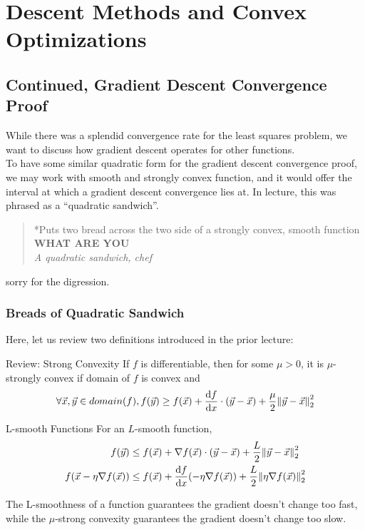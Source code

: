 \chapter{Descent Methods and Convex Optimizations}

\section{Continued, Gradient Descent Convergence Proof}
While there was a splendid convergence rate for the least squares problem, we want to discuss how gradient descent operates for other functions. \\
To have some similar quadratic form for the gradient descent convergence proof, we may work with smooth and strongly convex function, and it would offer the interval at which a gradient descent convergence lies at.
In lecture, this was phrased as a ``quadratic sandwich''.
\begin{quote}
    *Puts two bread across the two side of a strongly convex, smooth function \\
    \textbf{WHAT ARE YOU} \\
    \textit{A quadratic sandwich, chef}
\end{quote}
sorry for the digression.

\subsection{Breads of Quadratic Sandwich}
Here, let us review two definitions introduced in the prior lecture:
\begin{ln-define}{Review: Strong Convexity}{}
    If $f$ is differentiable, then for some $\mu > 0$, it is $\mu$-strongly convex if domain of $f$ is convex and
    \[
        \forall \vec{x}, \vec{y} \in domain(f), f(\vec{y}) \geq f(\vec{x}) + \dv{f}{x} \cdot (\vec{y} - \vec{x}) + \frac{\mu}{2} \pnorm[2]{\vec{y} - \vec{x}}{2}
    \]
\end{ln-define}
\begin{ln-define}{L-smooth Functions}{}
    For an $L$-smooth function,
    \begin{align*}
        f(\vec{y})
        &\leq f(\vec{x}) + \nabla f(\vec{x}) \cdot (\vec{y} - \vec{x}) + \frac{L}{2} \pnorm[2]{\vec{y} - \vec{x}}{2} \\
        f(\vec{x} - \eta \nabla f(\vec{x}))
        &\leq f(\vec{x}) + \dv{f}{x} {} (-\eta \nabla f(\vec{x})) + \frac{L}{2} \pnorm[2]{\eta \nabla f(\vec{x})}{2}
    \end{align*}
\end{ln-define}
The L-smoothness of a function guarantees the gradient doesn't change too fast, while the $\mu$-strong convexity guarantees the gradient doesn't change too slow.

